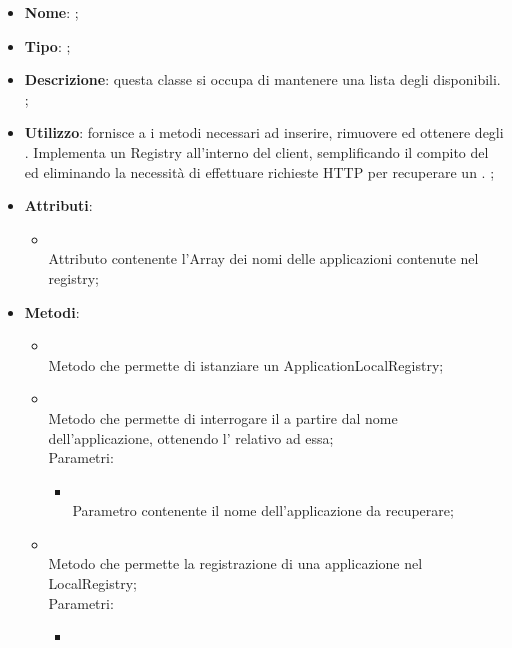 \begin{itemize}
	\item \textbf{Nome}: ;
	\item \textbf{Tipo}: ;
	\item \textbf{Descrizione}: questa classe si occupa di mantenere una lista degli  disponibili. ;
	\item \textbf{Utilizzo}: fornisce a  i metodi necessari ad inserire, rimuovere ed ottenere degli . Implementa un Registry all'interno del client, semplificando il compito del  ed eliminando la necessità di effettuare richieste HTTP per recuperare un . ;
	\item \textbf{Attributi}:
	\begin{itemize}
		\item[]  \\
		Attributo contenente l'Array dei nomi delle applicazioni contenute nel registry;
	\end{itemize}
	\item \textbf{Metodi}:
	\begin{itemize}
		\item[]  \\
		Metodo che permette di istanziare un ApplicationLocalRegistry;\\
		\item[]  \\
		Metodo che permette di interrogare il  a partire dal nome dell'applicazione, ottenendo l'  relativo ad essa;\\
		Parametri:
		\begin{itemize}
			\item {} \\
			Parametro contenente il nome dell'applicazione da recuperare;
		\end{itemize}
		\item[]  \\
		Metodo che permette la registrazione di una applicazione nel LocalRegistry;\\
		Parametri:
		\begin{itemize}
			\item {} \\

\end{itemize}
\end{itemize}
\end{itemize}
